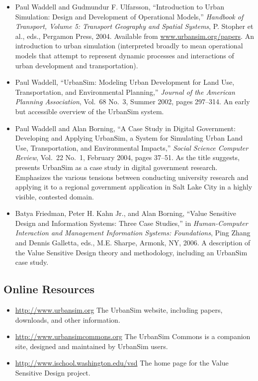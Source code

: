 \begin{itemize}

\item Paul Waddell and Gudmundur F. Ulfarsson, ``Introduction to Urban
Simulation: Design and Development of Operational Models,'' \emph{Handbook
of Transport, Volume 5: Transport Geography and Spatial Systems},
P. Stopher et al., eds., Pergamon Press, 2004.  Available from
\url{www.urbansim.org/papers}.  An introduction to urban simulation
(interpreted broadly to mean operational models that attempt to represent
dynamic processes and interactions of urban development and
transportation).

\item Paul Waddell, ``UrbanSim: Modeling Urban Development for Land Use,
Transportation, and Environmental Planning,'' \emph{Journal of the American
Planning Association}, Vol.\ 68 No.\ 3, Summer 2002, pages 297--314.  An
early but accessible overview of the UrbanSim system.

\item Paul Waddell and Alan Borning, ``A Case Study in Digital Government:
Developing and Applying UrbanSim, a System for Simulating Urban Land Use,
Transportation, and Environmental Impacts,'' \emph{Social Science Computer
Review}, Vol.\ 22 No.\ 1, February 2004, pages 37--51.  As the title
suggests, presents UrbanSim as a case study in digital government research.
Emphasizes the various tensions between conducting university research and
applying it to a regional government application in Salt Lake City
in a highly visible, contested domain.

\item Batya Friedman, Peter H. Kahn Jr., and Alan Borning, ``Value Sensitive
Design and Information Systems: Three Case Studies,'' in
\emph{Human-Computer Interaction and Management Information Systems:
Foundations}, Ping Zhang and Dennis Galletta, eds., M.E. Sharpe, Armonk,
NY, 2006.  A description of the Value Sensitive Design theory and
methodology, including an UrbanSim case study.

\end{itemize}

\subsection{Online Resources}

\begin{itemize}

\item \url{http://www.urbansim.org} The UrbanSim website, including
  papers, downloads, and other information.

\item \url{http://www.urbansimcommons.org} The UrbanSim Commons is a
  companion site, designed and maintained by UrbanSim users.

\item \url{http://www.ischool.washington.edu/vsd} The home page for the
  Value Sensitive Design project.

\end{itemize}

